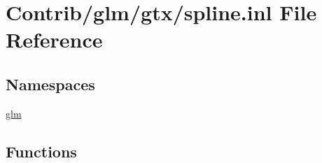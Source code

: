 \hypertarget{spline_8inl}{}\section{Contrib/glm/gtx/spline.inl File Reference}
\label{spline_8inl}
\subsection*{Namespaces}
\begin{DoxyCompactItemize}
\item 
 \mbox{\hyperlink{namespaceglm}{glm}}
\end{DoxyCompactItemize}
\subsection*{Functions}
